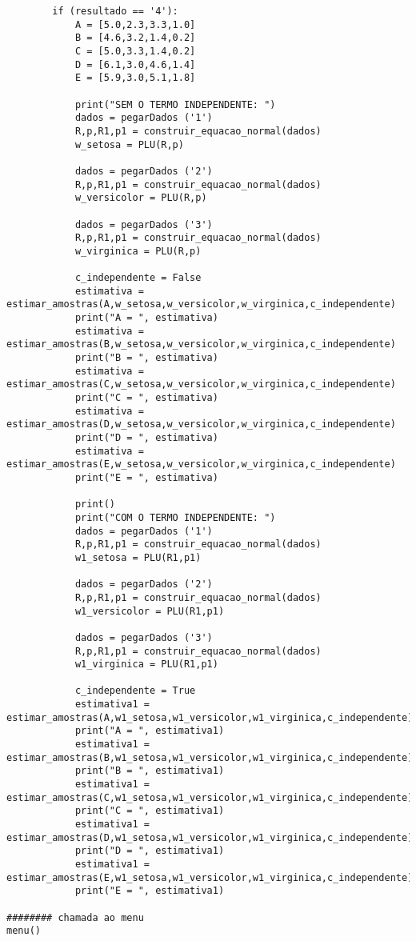 \documentclass[a4paper,12pt,twoside]{article}
\begin{document}
\begin{lstlisting}
        if (resultado == '4'):
            A = [5.0,2.3,3.3,1.0]
            B = [4.6,3.2,1.4,0.2]
            C = [5.0,3.3,1.4,0.2]
            D = [6.1,3.0,4.6,1.4]
            E = [5.9,3.0,5.1,1.8]
            
            print("SEM O TERMO INDEPENDENTE: ")
            dados = pegarDados ('1')
            R,p,R1,p1 = construir_equacao_normal(dados)
            w_setosa = PLU(R,p)
            
            dados = pegarDados ('2')
            R,p,R1,p1 = construir_equacao_normal(dados)
            w_versicolor = PLU(R,p)
            
            dados = pegarDados ('3')
            R,p,R1,p1 = construir_equacao_normal(dados)
            w_virginica = PLU(R,p)
            
            c_independente = False
            estimativa = estimar_amostras(A,w_setosa,w_versicolor,w_virginica,c_independente)
            print("A = ", estimativa)
            estimativa = estimar_amostras(B,w_setosa,w_versicolor,w_virginica,c_independente)
            print("B = ", estimativa)
            estimativa = estimar_amostras(C,w_setosa,w_versicolor,w_virginica,c_independente)
            print("C = ", estimativa)
            estimativa = estimar_amostras(D,w_setosa,w_versicolor,w_virginica,c_independente)
            print("D = ", estimativa)
            estimativa = estimar_amostras(E,w_setosa,w_versicolor,w_virginica,c_independente)
            print("E = ", estimativa)
            
            print()
            print("COM O TERMO INDEPENDENTE: ")
            dados = pegarDados ('1')
            R,p,R1,p1 = construir_equacao_normal(dados)
            w1_setosa = PLU(R1,p1)
            
            dados = pegarDados ('2')
            R,p,R1,p1 = construir_equacao_normal(dados)
            w1_versicolor = PLU(R1,p1)
            
            dados = pegarDados ('3')
            R,p,R1,p1 = construir_equacao_normal(dados)
            w1_virginica = PLU(R1,p1)
            
            c_independente = True
            estimativa1 = estimar_amostras(A,w1_setosa,w1_versicolor,w1_virginica,c_independente)
            print("A = ", estimativa1)
            estimativa1 = estimar_amostras(B,w1_setosa,w1_versicolor,w1_virginica,c_independente)
            print("B = ", estimativa1)
            estimativa1 = estimar_amostras(C,w1_setosa,w1_versicolor,w1_virginica,c_independente)
            print("C = ", estimativa1)
            estimativa1 = estimar_amostras(D,w1_setosa,w1_versicolor,w1_virginica,c_independente)
            print("D = ", estimativa1)
            estimativa1 = estimar_amostras(E,w1_setosa,w1_versicolor,w1_virginica,c_independente)
            print("E = ", estimativa1)
            
######## chamada ao menu
menu()
\end{lstlisting}
\end{document}
